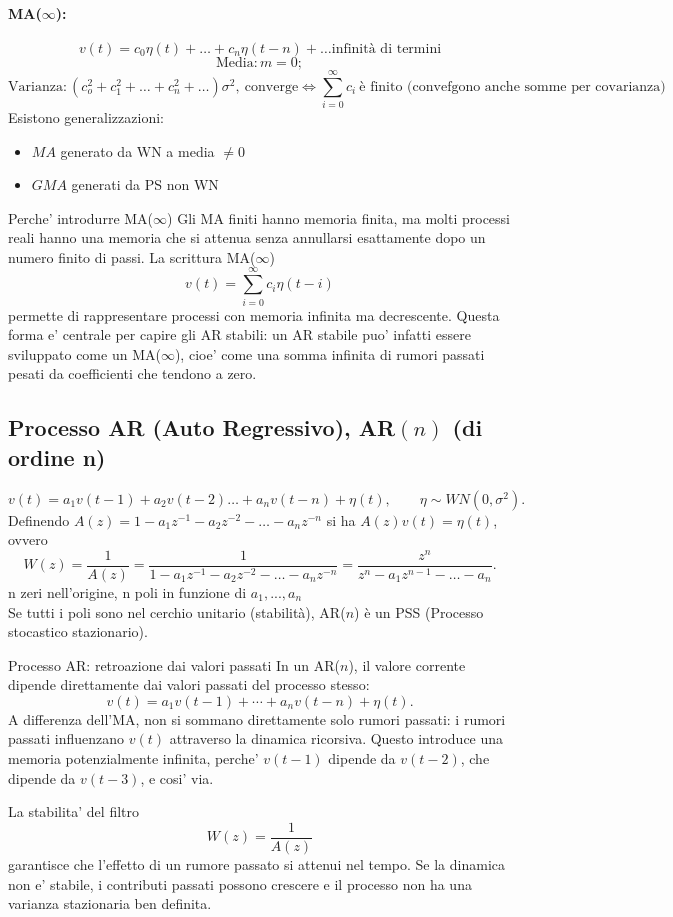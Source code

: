 \documentclass[11pt,a4paper]{article}
\begin{document}
\paragraph{MA($\infty$):}
\[
v(t) = c_0\eta(t)+\dots+c_n\eta(t-n) + \dots \text{infinità di termini}
\]
\[
\text{Media}: m = 0;
\]
\[
\text{Varianza}:(c_o^2+c_1^2+\dots+c_n^2+\dots)\sigma^2, \ \text{converge} \iff \sum_{i=0}^{\infty}c_i \ \text{è finito (convefgono anche somme per covarianza)}  
\]
Esistono generalizzazioni:
\begin{itemize}
    \item $MA$ generato da WN a media $\neq 0$
    \item $GMA$ generati da PS non WN
\end{itemize}

\begin{spiegazione}{Perche' introdurre MA($\infty$)}
Gli MA finiti hanno memoria finita, ma molti processi reali hanno una memoria che si attenua senza annullarsi esattamente dopo un numero finito di passi. La scrittura MA($\infty$)
\[
v(t)=\sum_{i=0}^{\infty}c_i\eta(t-i)
\]
permette di rappresentare processi con memoria infinita ma decrescente. Questa forma e' centrale per capire gli AR stabili: un AR stabile puo' infatti essere sviluppato come un MA($\infty$), cioe' come una somma infinita di rumori passati pesati da coefficienti che tendono a zero.
\end{spiegazione}

\subsection{Processo AR (Auto Regressivo), AR\texorpdfstring{$(n)$}{(n)} (di ordine n)}
\[
v(t)=a_1 v(t-1)+a_2v(t-2)\dots+a_n v(t-n)+\eta(t),\qquad \eta\sim WN(0,\sigma^2).
\]
Definendo $A(z)=1-a_1 z^{-1}-a_2z^{-2}-\dots-a_n z^{-n}$ si ha $A(z)v(t)=\eta(t)$, ovvero
\[
W(z)=\frac{1}{A(z)} =\frac{1}{1-a_1 z^{-1}-a_2z^{-2}-\dots-a_n z^{-n}} =\frac{z^n}{z^n-a_1 z^{n-1}-\dots-a_n}.
\]
n zeri nell'origine, n poli in funzione di $a_1,...,a_n$ \\
Se tutti i poli sono nel cerchio unitario (stabilità), AR($n$) è un PSS (Processo stocastico stazionario).

\begin{spiegazione}{Processo AR: retroazione dai valori passati}
In un AR($n$), il valore corrente dipende direttamente dai valori passati del processo stesso:
\[
v(t)=a_1v(t-1)+\cdots+a_nv(t-n)+\eta(t).
\]
A differenza dell'MA, non si sommano direttamente solo rumori passati: i rumori passati influenzano $v(t)$ attraverso la dinamica ricorsiva. Questo introduce una memoria potenzialmente infinita, perche' $v(t-1)$ dipende da $v(t-2)$, che dipende da $v(t-3)$, e cosi' via.

La stabilita' del filtro
\[
W(z)=\frac{1}{A(z)}
\]
garantisce che l'effetto di un rumore passato si attenui nel tempo. Se la dinamica non e' stabile, i contributi passati possono crescere e il processo non ha una varianza stazionaria ben definita.
\end{spiegazione}
\end{document}
